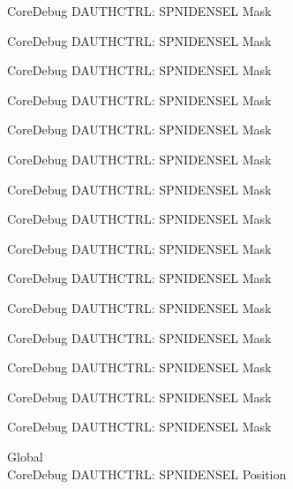 \begin{DoxyRefList}
\label{deprecated__deprecated000142}%
%
Core\+Debug DAUTHCTRL\+: SPNIDENSEL Mask 

\label{deprecated__deprecated000218}%
%
Core\+Debug DAUTHCTRL\+: SPNIDENSEL Mask 

\label{deprecated__deprecated000281}%
%
Core\+Debug DAUTHCTRL\+: SPNIDENSEL Mask 

\label{deprecated__deprecated000360}%
%
Core\+Debug DAUTHCTRL\+: SPNIDENSEL Mask 

\label{deprecated__deprecated000436}%
%
Core\+Debug DAUTHCTRL\+: SPNIDENSEL Mask 

\label{deprecated__deprecated000539}%
%
Core\+Debug DAUTHCTRL\+: SPNIDENSEL Mask 

\label{deprecated__deprecated000641}%
%
Core\+Debug DAUTHCTRL\+: SPNIDENSEL Mask 

\label{deprecated__deprecated000766}%
%
Core\+Debug DAUTHCTRL\+: SPNIDENSEL Mask 

\label{deprecated__deprecated000820}%
%
Core\+Debug DAUTHCTRL\+: SPNIDENSEL Mask 

\label{deprecated__deprecated000896}%
%
Core\+Debug DAUTHCTRL\+: SPNIDENSEL Mask 

\label{deprecated__deprecated000959}%
%
Core\+Debug DAUTHCTRL\+: SPNIDENSEL Mask 

\label{deprecated__deprecated001038}%
%
Core\+Debug DAUTHCTRL\+: SPNIDENSEL Mask 

\label{deprecated__deprecated001114}%
%
Core\+Debug DAUTHCTRL\+: SPNIDENSEL Mask 

\label{deprecated__deprecated001217}%
%
Core\+Debug DAUTHCTRL\+: SPNIDENSEL Mask 

\label{deprecated__deprecated001319}%
%
Core\+Debug DAUTHCTRL\+: SPNIDENSEL Mask  
\item[Global \doxylink{group___c_m_s_i_s___s_c_b_ga866734a8e4bec2d6cf091e265c6c0f3d}{Core\+Debug\+\_\+\+DAUTHCTRL\+\_\+\+SPNIDENSEL\+\_\+\+Pos} ]\hfill \\
\label{deprecated__deprecated000087}%
%
Core\+Debug DAUTHCTRL\+: SPNIDENSEL Position 


\end{DoxyRefList}
